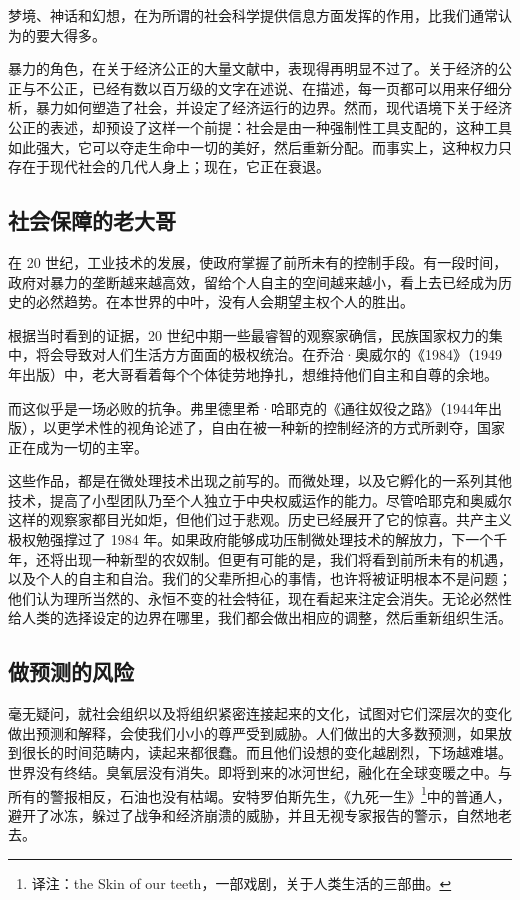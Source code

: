 梦境、神话和幻想，在为所谓的社会科学提供信息方面发挥的作用，比我们通常认为的要大得多。


暴力的角色，在关于经济公正的大量文献中，表现得再明显不过了。关于经济的公正与不公正，已经有数以百万级的文字在述说、在描述，每一页都可以用来仔细分析，暴力如何塑造了社会，并设定了经济运行的边界。然而，现代语境下关于经济公正的表述，却预设了这样一个前提：社会是由一种强制性工具支配的，这种工具如此强大，它可以夺走生命中一切的美好，然后重新分配。而事实上，这种权力只存在于现代社会的几代人身上；现在，它正在衰退。


\subsection{社会保障的老大哥}
在 20 世纪，工业技术的发展，使政府掌握了前所未有的控制手段。有一段时间，政府对暴力的垄断越来越高效，留给个人自主的空间越来越小，看上去已经成为历史的必然趋势。在本世界的中叶，没有人会期望主权个人的胜出。


根据当时看到的证据，20 世纪中期一些最睿智的观察家确信，民族国家权力的集中，将会导致对人们生活方方面面的极权统治。在乔治·奥威尔的《1984》（1949年出版）中，老大哥看着每个个体徒劳地挣扎，想维持他们自主和自尊的余地。


而这似乎是一场必败的抗争。弗里德里希·哈耶克的《通往奴役之路》（1944年出版），以更学术性的视角论述了，自由在被一种新的控制经济的方式所剥夺，国家正在成为一切的主宰。


这些作品，都是在微处理技术出现之前写的。而微处理，以及它孵化的一系列其他技术，提高了小型团队乃至个人独立于中央权威运作的能力。尽管哈耶克和奥威尔这样的观察家都目光如炬，但他们过于悲观。历史已经展开了它的惊喜。共产主义极权勉强撑过了 1984 年。如果政府能够成功压制微处理技术的解放力，下一个千年，还将出现一种新型的农奴制。但更有可能的是，我们将看到前所未有的机遇，以及个人的自主和自治。我们的父辈所担心的事情，也许将被证明根本不是问题；他们认为理所当然的、永恒不变的社会特征，现在看起来注定会消失。无论必然性给人类的选择设定的边界在哪里，我们都会做出相应的调整，然后重新组织生活。


\subsection{做预测的风险}
毫无疑问，就社会组织以及将组织紧密连接起来的文化，试图对它们深层次的变化做出预测和解释，会使我们小小的尊严受到威胁。人们做出的大多数预测，如果放到很长的时间范畴内，读起来都很蠢。而且他们设想的变化越剧烈，下场越难堪。世界没有终结。臭氧层没有消失。即将到来的冰河世纪，融化在全球变暖之中。与所有的警报相反，石油也没有枯竭。安特罗伯斯先生，《九死一生》\footnote{译注：the Skin of our teeth，一部戏剧，关于人类生活的三部曲。}中的普通人，避开了冰冻，躲过了战争和经济崩溃的威胁，并且无视专家报告的警示，自然地老去。


